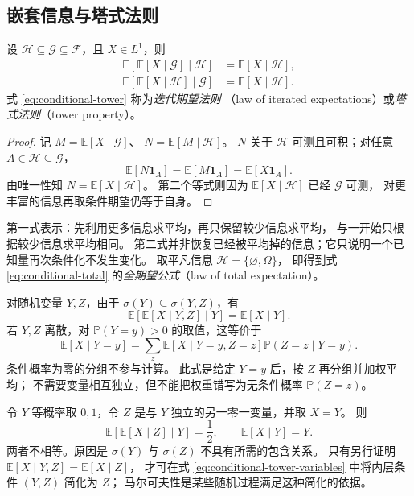 \documentclass[UTF8,12pt,a4paper,fontset=fandol]{ctexart}
\begin{document}
\subsection{嵌套信息与塔式法则}

\begin{theorem}[条件期望的迭代法则]
\label{thm:conditional-tower}
设 $\mathcal H\subseteq\mathcal G\subseteq\mathcal F$，且 $X\in L^1$，则
\begin{align}
  \mathbb E[\mathbb E[X\mid\mathcal G]\mid\mathcal H]
    &=\mathbb E[X\mid\mathcal H],
    \label{eq:conditional-tower}\\
  \mathbb E[\mathbb E[X\mid\mathcal H]\mid\mathcal G]
    &=\mathbb E[X\mid\mathcal H].
    \label{eq:conditional-tower-reverse}
\end{align}
式 \eqref{eq:conditional-tower} 称为\emph{迭代期望法则}
（law of iterated expectations）或\emph{塔式法则}（tower property）。
\end{theorem}

\begin{proof}
记 $M=\mathbb E[X\mid\mathcal G]$、
$N=\mathbb E[M\mid\mathcal H]$。
$N$ 关于 $\mathcal H$ 可测且可积；对任意 $A\in\mathcal H\subseteq\mathcal G$，
\[
  \mathbb E[N\mathbf1_A]
  =\mathbb E[M\mathbf1_A]
  =\mathbb E[X\mathbf1_A].
\]
由唯一性知 $N=\mathbb E[X\mid\mathcal H]$。
第二个等式则因为 $\mathbb E[X\mid\mathcal H]$ 已经 $\mathcal G$ 可测，
对更丰富的信息再取条件期望仍等于自身。
\end{proof}

第一式表示：先利用更多信息求平均，再只保留较少信息求平均，
与一开始只根据较少信息求平均相同。
第二式并非恢复已经被平均掉的信息；它只说明一个已知量再次条件化不发生变化。
取平凡信息 $\mathcal H=\{\varnothing,\Omega\}$，
即得到式 \eqref{eq:conditional-total} 的\emph{全期望公式}（law of total expectation）。

对随机变量 $Y,Z$，由于 $\sigma(Y)\subseteq\sigma(Y,Z)$，有
\begin{equation}
  \mathbb E[\mathbb E[X\mid Y,Z]\mid Y]
  =\mathbb E[X\mid Y].
  \label{eq:conditional-tower-variables}
\end{equation}
若 $Y,Z$ 离散，对 $\mathbb P(Y=y)>0$ 的取值，这等价于
\[
  \mathbb E[X\mid Y=y]
  =\sum_z
    \mathbb E[X\mid Y=y,Z=z]\mathbb P(Z=z\mid Y=y).
\]
条件概率为零的分组不参与计算。
此式是给定 $Y=y$ 后，按 $Z$ 再分组并加权平均；
不需要变量相互独立，但不能把权重错写为无条件概率 $\mathbb P(Z=z)$。

\begin{example}[条件信息不能任意删去]
\label{ex:conditional-nonnested}
令 $Y$ 等概率取 $0,1$，令 $Z$ 是与 $Y$ 独立的另一零一变量，并取 $X=Y$。
则
\[
  \mathbb E[\mathbb E[X\mid Z]\mid Y]=\frac12,
  \qquad
  \mathbb E[X\mid Y]=Y.
\]
两者不相等。原因是 $\sigma(Y)$ 与 $\sigma(Z)$ 不具有所需的包含关系。
只有另行证明 $\mathbb E[X\mid Y,Z]=\mathbb E[X\mid Z]$，
才可在式 \eqref{eq:conditional-tower-variables} 中将内层条件 $(Y,Z)$ 简化为 $Z$；
马尔可夫性是某些随机过程满足这种简化的依据。
\end{example}
\end{document}
